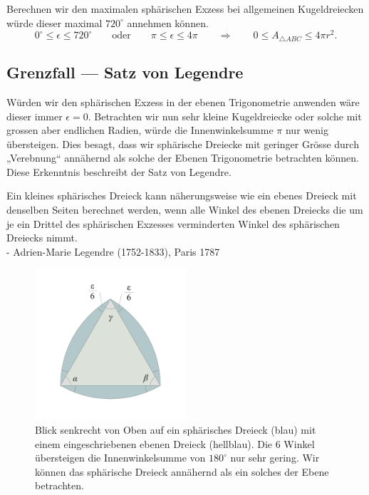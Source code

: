 \begin{refsection}
Berechnen wir den maximalen sphärischen Exzess bei allgemeinen
Kugeldreiecken würde dieser maximal $720^{\circ}$ annehmen können.
\[
0^{\circ} \le \epsilon \le 720^{\circ}
\qquad \text{oder} \qquad
\pi \le \epsilon \le 4\pi
\qquad \Rightarrow \qquad
0 \le A_{\triangle{ ABC }} \le 4 \pi r^2.
\]


\subsection{Grenzfall --- Satz von Legendre}
Würden wir den sphärischen Exzess in der ebenen Trigonometrie
anwenden wäre dieser immer $\epsilon=0$. Betrachten wir nun sehr
kleine Kugeldreiecke oder solche mit grossen aber endlichen Radien,
würde die Innenwinkelsumme $\pi$ nur wenig übersteigen. Dies besagt,
dass wir sphärische Dreiecke mit geringer Grösse durch „Verebnung“
annähernd als solche der Ebenen Trigonometrie betrachten können.
Diese Erkenntnis beschreibt der Satz von Legendre.

\begin{satz}Ein kleines sphärisches Dreieck kann näherungsweise 
wie ein ebenes Dreieck mit denselben Seiten berechnet 
werden, wenn alle Winkel des ebenen Dreiecks die um 
je ein Drittel des sphärischen Exzesses verminderten 
Winkel des sphärischen Dreiecks nimmt. 
\\
\quad \quad - Adrien-Marie Legendre (1752-1833), Paris 1787
\label{skript:kugel:satz:Legendre}
\end{satz}
%

\begin{figure}[htbp]
\centering
\includegraphics[width=0.5\textwidth]{kugel/SphaerischerExzess.jpg}
\caption{Blick senkrecht von Oben auf ein sphärisches Dreieck (blau)
mit einem eingeschriebenen ebenen Dreieck (hellblau). Die 6 Winkel
übersteigen die Innenwinkelsumme von $180^{\circ}$ nur sehr gering.
Wir können das sphärische Dreieck annähernd als ein solches der
Ebene betrachten.}
\end{figure}


\end{refsection}
